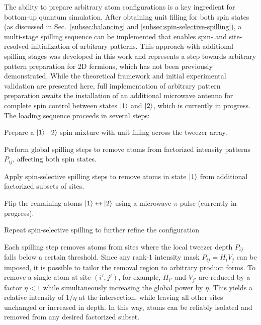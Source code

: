 

The ability to prepare arbitrary atom configurations is a key ingredient for bottom-up quantum simulation. After obtaining unit filling for both spin states (as discussed in Sec.~\ref{subsec:balancing} and \ref{subsec:spin-selective-spilling}), a multi-stage spilling sequence can be implemented that enables spin- and site-resolved initialization of arbitrary patterns. This approach with additional spilling stages was developed in this work and represents a step towards arbitrary pattern preparation for 2D fermions, which has not been previously demonstrated. While the theoretical framework and initial experimental validation are presented here, full implementation of arbitrary pattern preparation awaits the installation of an additional microwave antenna for complete spin control between states $\left| 1 \right\rangle$ and $\left| 2 \right\rangle$, which is currently in progress. The loading sequence proceeds in several steps:
\begin{enumerate*}
    \item Prepare a $\left| 1 \right\rangle$–$\left| 2 \right\rangle$ spin mixture with unit filling across the tweezer array.
    \item Perform global spilling steps to remove atoms from factorized intensity patterns $P_{ij}$, affecting both spin states.
    \item Apply spin-selective spilling steps to remove atoms in state $\left| 1 \right\rangle$ from additional factorized subsets of sites.
    \item Flip the remaining atoms $\left| 1 \right\rangle \leftrightarrow \left| 2 \right\rangle$ using a microwave $\pi$-pulse (currently in progress).
    \item Repeat spin-selective spilling to further refine the configuration
\end{enumerate*}

Each spilling step removes atoms from sites where the local tweezer depth $P_{ij}$ falls below a certain threshold. Since any rank-1 intensity mask $P_{ij} = H_i V_j$ can be imposed, it is possible to tailor the removal region to arbitrary product forms. To remove a single atom at site $(i', j')$, for example, $H_{i'}$ and $V_{j'}$ are reduced by a factor $\eta < 1$ while simultaneously increasing the global power by $\eta$. This yields a relative intensity of $1/\eta$ at the intersection, while leaving all other sites unchanged or increased in depth. In this way, atoms can be reliably isolated and removed from any desired factorized subset.

